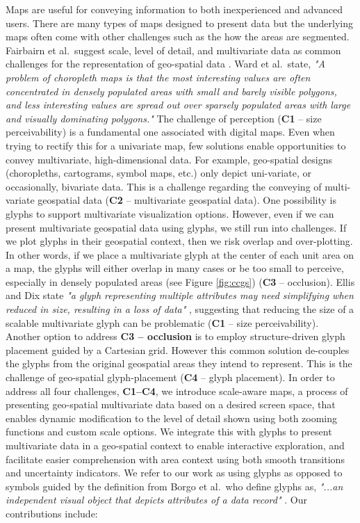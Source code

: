 Maps are useful for conveying information to both inexperienced and advanced users. There are many types of maps designed to present data but the underlying maps often come with other challenges such as the how the areas are segmented. Fairbairn et al.\ suggest scale, level of detail, and multivariate data as common challenges for the representation of geo-spatial data \cite{fairbairn2001representation}.  Ward et al.\ state, \emph{"A problem of choropleth maps is that the most interesting values are often concentrated in densely populated areas with small and barely visible polygons, and less interesting values are spread out over sparsely populated areas with large and visually dominating polygons."} The challenge of perception (\textbf{C1} -- size perceivability) is a fundamental one associated with digital maps. Even when trying to rectify this for a univariate map, few solutions enable opportunities to convey multivariate, high-dimensional data. For example, geo-spatial designs (choropleths, cartograms, symbol maps, etc.) only depict uni-variate, or occasionally, bivariate data. This is a challenge regarding the conveying of multi-variate geospatial data (\textbf{C2} -- multivariate geospatial data). One possibility is glyphs to support multivariate visualization options. However, even if we can present multivariate geospatial data using glyphs, we still run into challenges. If we plot glyphs in their geospatial context, then we risk overlap and over-plotting. In other words, if we place a multivariate glyph at the center of each unit area on a map, the glyphs will either overlap in many cases or be too small to perceive, especially in densely populated areas (see Figure \ref{fig:ccgs}) (\textbf{C3} -- occlusion). Ellis and Dix state \emph{"a glyph representing multiple attributes may need simplifying when reduced in size, resulting in a loss of data"} \cite{ellis2007taxonomy}, suggesting that reducing the size of a scalable multivariate glyph can be problematic (\textbf{C1} -- size perceivability). Another option to address \textbf{\textbf{C3} -- occlusion} is to employ structure-driven glyph placement guided by a Cartesian grid. However this common solution de-couples the glyphs from the original geospatial areas they intend to represent. This is the challenge of geo-spatial glyph-placement (\textbf{C4} -- glyph placement).
In order to address all four challenges, \textbf{C1--C4}, we introduce scale-aware maps, a process of presenting geo-spatial multivariate data based on a desired screen space,  that enables dynamic modification to the level of detail shown using both zooming functions and custom scale options. We integrate this with glyphs to present multivariate data in a geo-spatial context to enable interactive exploration, and facilitate easier comprehension with area context using both smooth transitions and uncertainty indicators. We refer to our work as using glyphs as opposed to symbols guided by the definition from Borgo et al.\ who define glyphs as, \emph{"...an independent visual object that depicts attributes of a data record"} \cite{borgo2013glyph}. Our contributions include:
